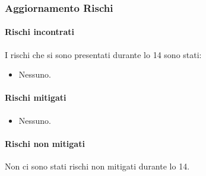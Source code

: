 \subsubsection{Aggiornamento Rischi}
\label{sec:aggiornamento_rischi_sprint14}

\paragraph{Rischi incontrati}
\label{par:rischi_incontrati_sprint14}
I rischi che si sono presentati durante lo  14 sono stati:
\begin{itemize}
    \item Nessuno.
\end{itemize}

\paragraph{Rischi mitigati}
\label{par:rischi_mitigati_sprint14}
\begin{itemize}
    \item Nessuno.
\end{itemize}

\paragraph{Rischi non mitigati}
\label{par:rischi_non_mitigati_sprint14}
Non ci sono stati rischi non mitigati durante lo  14.